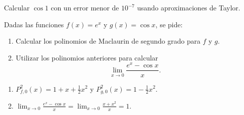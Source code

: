 {Calcular $\cos 1$ con un error menor de $10^{-7}$ usando aproximaciones de Taylor.
}


{Dadas las funciones
$f(x)=e^x$ y $g(x)=\cos x$, se pide:
\begin{enumerate}
   \item  Calcular los polinomios de Maclaurin de segundo grado para $f$
   y $g$.

   \item  Utilizar los polinomios anteriores para calcular
   \[ \lim_{x\rightarrow 0}\frac{e^x-\cos x}{x}.\]
\end{enumerate}
}
{\begin{enumerate}
\item $P^2_{f,0}(x) = 1+x+\frac{1}{2}x^2$ y $P^2_{g,0}(x) = 1-\frac{1}{2}x^2$.
\item $\lim_{x\rightarrow 0}\frac{e^x-\cos x}{x} = \lim_{x\rightarrow 0}\frac{x+x^2}{x} = 1$.
\end{enumerate}
}
{
}


